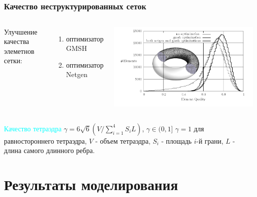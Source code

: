 \documentclass[ucs]{beamer}
\begin{document}
\subsection{}
\begin{frame}
	\frametitle{Качество неструктурированных сеток}
	\begin{columns}
	Улучшение качества элеметнов сетки:
	\begin{enumerate}
	\item оптимизатор GMSH
	\item оптимизатор Netgen
	\end{enumerate}
		\includegraphics[width=\columnwidth]{optimizers.png}
	\end{columns}
	\textcolor{cyan}{Качество тетраэдра} $\gamma=6 \sqrt{6} (V/\displaystyle\sum_{i=1}^4 S_i L)$, $\gamma \in (0,1]$\newline
	$\gamma = 1$ для равностороннего тетраэдра,\newline
	$V$ - объем тетраэдра,\newline 
	$S_i$ - площадь $i$-й грани,\newline 
	$L$ - длина самого длинного ребра.\newline 
\end{frame}

\section{Результаты моделирования}
\end{document}
